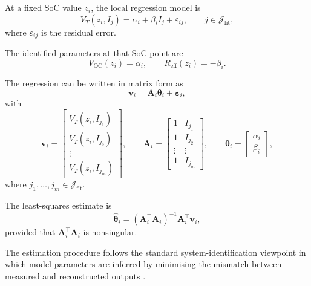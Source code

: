 \documentclass[a4paper,12pt]{article}
\newcommand{\mat}[1]{\mathbf{#1}}
\newcommand{\vect}[1]{\bm{#1}}
\begin{document}
At a fixed SoC value \(z_i\), the local regression model is
\begin{equation}
V_T(z_i,I_j)
=
\alpha_i
+
\beta_i I_j
+
\varepsilon_{ij},
\qquad
j\in\mathcal{J}_{\mathrm{fit}},
\label{eq:method_local_regression}
\end{equation}
where \(\varepsilon_{ij}\) is the residual error.

The identified parameters at that SoC point are
\begin{equation}
V_{\mathrm{OC}}(z_i)
=
\alpha_i,
\qquad
R_{\mathrm{eff}}(z_i)
=
-\beta_i.
\label{eq:method_ocv_reff_from_regression}
\end{equation}

The regression can be written in matrix form as
\begin{equation}
\vect{v}_i
=
\mat{A}_i \vect{\theta}_i
+
\vect{\varepsilon}_i,
\label{eq:method_regression_matrix_form}
\end{equation}
with
\begin{equation}
\vect{v}_i
=
\begin{bmatrix}
V_T(z_i,I_{j_1})\\
V_T(z_i,I_{j_2})\\
\vdots\\
V_T(z_i,I_{j_m})
\end{bmatrix},
\qquad
\mat{A}_i
=
\begin{bmatrix}
1 & I_{j_1}\\
1 & I_{j_2}\\
\vdots & \vdots\\
1 & I_{j_m}
\end{bmatrix},
\qquad
\vect{\theta}_i
=
\begin{bmatrix}
\alpha_i\\
\beta_i
\end{bmatrix},
\label{eq:method_regression_matrices}
\end{equation}
where \(j_1,\ldots,j_m\in\mathcal{J}_{\mathrm{fit}}\).

The least-squares estimate is
\begin{equation}
\hat{\vect{\theta}}_i
=
\left(\mat{A}_i^{\top}\mat{A}_i\right)^{-1}
\mat{A}_i^{\top}\vect{v}_i,
\label{eq:method_local_ls_solution}
\end{equation}
provided that \(\mat{A}_i^{\top}\mat{A}_i\) is nonsingular.

The estimation procedure follows the standard system-identification viewpoint in which model parameters are inferred by minimising the mismatch between measured and reconstructed outputs \cite{ljung_system_identification}.
\end{document}
